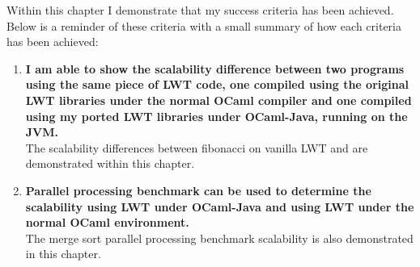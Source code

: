 \documentclass[12pt,twoside,notitlepage]{report}
\begin{document}
%
%

%
%
Within this chapter I demonstrate that my success criteria has been achieved. Below is a reminder of these criteria with a small summary of how each criteria has been achieved:

\begin{enumerate}
\item {\bf I am able to show the scalability difference between two programs using the same piece of LWT code, one compiled using the original LWT libraries under the normal OCaml compiler and one compiled using my ported LWT libraries
under OCaml-Java, running on the JVM.}\hfill \\
The scalability differences between fibonacci on vanilla LWT and  are demonstrated within this chapter.
\item {\bf Parallel processing benchmark can be used to determine the scalability using LWT under OCaml-Java and using LWT under the normal OCaml environment.}\hfill \\
The merge sort parallel processing benchmark scalability is also demonstrated in this chapter.
\end{enumerate}

%
%
\end{document}
